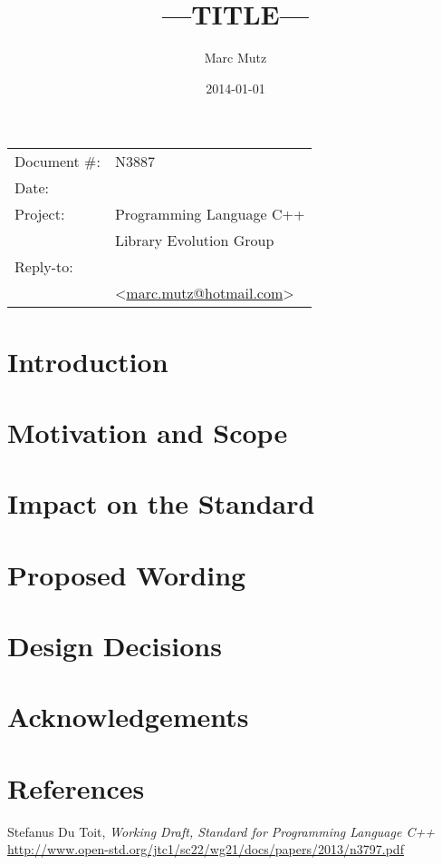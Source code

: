 \documentclass[11pt]{article}
\date{}
\title{---TITLE---}
\makeatletter
\newcommand{\emailaddress}{marc.mutz@hotmail.com}
\newcommand{\email}{\href{mailto:\emailaddress}{\emailaddress}}
\makeatother
\begin{document}
\maketitle\vspace{-2cm}

\begin{flushright}
  \begin{tabular}{ll}
  Document \#:&N3887\\
  Date:       &\date{2014-01-01}\\
  Project:    &Programming Language C++\\
              &Library Evolution Group\\
  Reply-to:   &\author{Marc Mutz}\\
              &\textless\email\textgreater
  \end{tabular}
\end{flushright}

\section{Introduction}

\section{Motivation and Scope}

\section{Impact on the Standard}

\section{Proposed Wording}

\section{Design Decisions}

\section{Acknowledgements}

\section{References}
\renewcommand{\section}[2]{}%
\begin{thebibliography}{9}

    Stefanus Du Toit,
    \emph{Working Draft, Standard for Programming Language C++}\newline
    \url{http://www.open-std.org/jtc1/sc22/wg21/docs/papers/2013/n3797.pdf}

\end{thebibliography}
\end{document}
